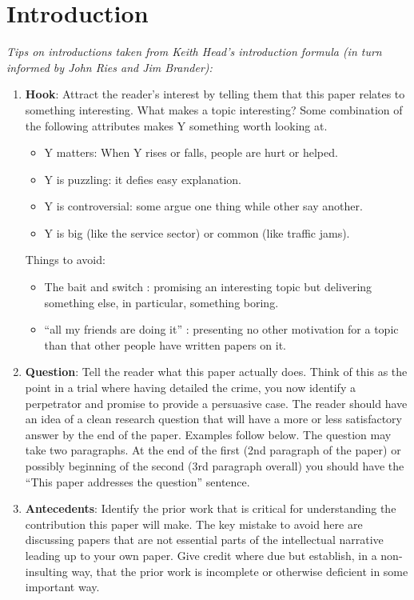 \section{Introduction}
\textit{Tips on introductions taken from Keith Head's introduction formula (in turn informed by John Ries and Jim Brander):}
\begin{enumerate}
\item \textbf{Hook}: Attract the reader's interest by telling them that this paper relates to something interesting. What makes a topic interesting? Some combination of the following attributes makes Y something worth looking at.
\begin{itemize}
\item Y matters: When Y rises or falls, people are hurt or helped.
\item Y is puzzling: it defies easy explanation.
\item Y is controversial: some argue one thing while other say another.
\item Y is big (like the service sector) or common (like traffic jams).
\end{itemize}
Things to avoid: 
\begin{itemize}
\item The bait and switch : promising an interesting topic but delivering something else, in particular, something boring.
\item ``all my friends are doing it'' : presenting no other motivation for a topic than that other people have written papers on it.
\end{itemize}

\item \textbf{Question}: Tell the reader what this paper actually does. Think of this as the point in a trial where having detailed the crime, you now identify a perpetrator and promise to provide a persuasive case. The reader should have an idea of a clean research question that will have a more or less satisfactory answer by the end of the paper. Examples follow below. The question may take two paragraphs. At the end of the first (2nd paragraph of the paper) or possibly beginning of the second (3rd paragraph overall) you should have the ``This paper addresses the question'' sentence.

\item \textbf{Antecedents}: Identify the prior work that is critical for understanding the contribution this paper will make. The key mistake to avoid here are discussing papers that are not essential parts of the intellectual narrative leading up to your own paper. Give credit where due but establish, in a non-insulting way, that the prior work is incomplete or otherwise deficient in some important way.


\end{enumerate}
